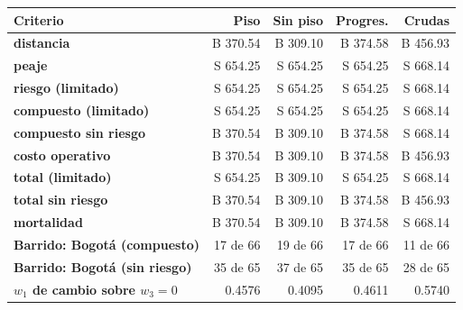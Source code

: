 \renewcommand{\arraystretch}{1.2}
\begin{tabular}{|l|r|r|r|r|}
\hline
\rowcolor{gray!20} \textbf{Criterio} & \textbf{Piso} & \textbf{Sin piso} & \textbf{Progres.} & \textbf{Crudas} \\
\hline
\textbf{distancia} & B 370.54 & B 309.10 & B 374.58 & B 456.93 \\
\hline
\textbf{peaje} & S 654.25 & S 654.25 & S 654.25 & S 668.14 \\
\hline
\textbf{riesgo (limitado)} & S 654.25 & S 654.25 & S 654.25 & S 668.14 \\
\hline
\textbf{compuesto (limitado)} & S 654.25 & S 654.25 & S 654.25 & S 668.14 \\
\hline
\textbf{compuesto sin riesgo} & B 370.54 & B 309.10 & B 374.58 & S 668.14 \\
\hline
\textbf{costo operativo} & B 370.54 & B 309.10 & B 374.58 & B 456.93 \\
\hline
\textbf{total (limitado)} & S 654.25 & B 309.10 & S 654.25 & S 668.14 \\
\hline
\textbf{total sin riesgo} & B 370.54 & B 309.10 & B 374.58 & B 456.93 \\
\hline
\textbf{mortalidad} & B 370.54 & B 309.10 & B 374.58 & S 668.14 \\
\hline
\textbf{Barrido: Bogotá (compuesto)} & 17 de 66 & 19 de 66 & 17 de 66 & 11 de 66 \\
\hline
\textbf{Barrido: Bogotá (sin riesgo)} & 35 de 65 & 37 de 65 & 35 de 65 & 28 de 65 \\
\hline
\textbf{$w_1$ de cambio sobre $w_3=0$} & 0.4576 & 0.4095 & 0.4611 & 0.5740 \\
\hline
\end{tabular}
